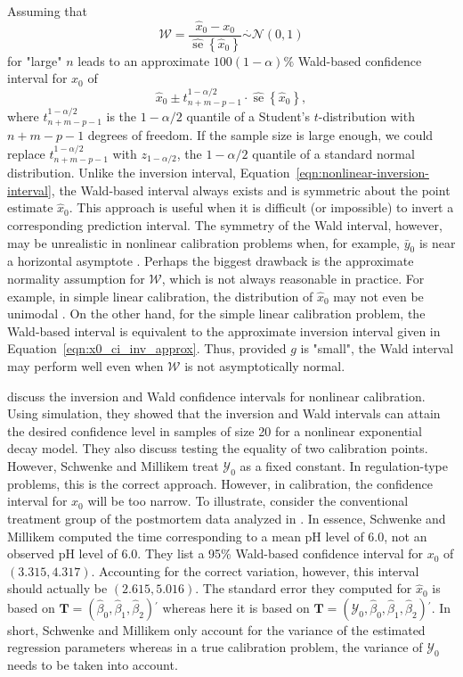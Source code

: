 \documentclass[cmfont,usenames,dvipsnames,leqno]{afit-etd}\usepackage[]{graphicx}\usepackage[]{color}
\newcommand{\trans}{\ensuremath{^\prime}}
\newcommand{\mc}[1]{\ensuremath{\mathcal{#1}}}
\newcommand{\wh}[1]{\ensuremath{\widehat{#1}}}
\newcommand{\se}{\operatorname{se}}
\begin{document}
Assuming that
\begin{equation}
\label{eqn:approx_pivot}
  \mc{W} = \frac{\wh{x}_0 - x_0}{\wh{\se}\left\{\wh{x}_0\right\}} \stackrel{\cdot}{\sim} \mc{N}(0, 1)
\end{equation}
for "large" $n$ leads to an approximate $100(1-\alpha)\%$ Wald-based confidence interval for $x_0$ of 
\begin{equation}
\label{eqn:x0_ci_wald}
  \wh{x}_0 \pm t_{n+m-p-1}^{1-\alpha/2} \cdot \wh{\se}\left\{\wh{x}_0\right\},
\end{equation}
where $t_{n+m-p-1}^{1-\alpha/2}$ is the $1-\alpha/2$ quantile of a Student's $t$-distribution with $n+m-p-1$ degrees of freedom. If the sample size is large enough, we could replace $t_{n+m-p-1}^{1-\alpha/2}$ with $z_{1-\alpha/2}$, the $1-\alpha/2$ quantile of a standard normal distribution. Unlike the inversion interval, Equation~\eqref{eqn:nonlinear-inversion-interval}, the Wald-based interval always exists and is symmetric about the point estimate $\wh{x}_0$. This approach is useful when it is difficult (or impossible) to invert a corresponding prediction interval. The symmetry of the Wald interval, however, may be unrealistic in nonlinear calibration problems when, for example, $\bar{y}_0$ is near a horizontal asymptote \citep{schwenke_callibration_1991}. Perhaps the biggest drawback is the approximate normality assumption for $\mc{W}$, which is not always reasonable in practice. For example, in simple linear calibration, the distribution of $\wh{x}_0$ may not even be unimodal \citep{buonaccorsi_design_1986}. On the other hand, for the simple linear calibration problem, the Wald-based interval is equivalent to the approximate inversion interval given in Equation~\eqref{eqn:x0_ci_inv_approx}. Thus, provided $g$ is "small", the Wald interval may perform well even when $\mc{W}$ is not asymptotically normal.

\citet{schwenke_callibration_1991} discuss the inversion and Wald confidence intervals for nonlinear calibration. Using simulation, they showed that the inversion and Wald intervals can attain the desired confidence level in samples of size 20 for a nonlinear exponential decay model. They also discuss testing the equality of two calibration points. However, Schwenke and Millikem treat $\mc{Y}_0$ as a fixed constant. In regulation-type problems, this is the correct approach. However, in calibration, the confidence interval for $x_0$ will be too narrow. To illustrate, consider the conventional treatment group of the postmortem data analyzed in \citet{schwenke_callibration_1991}. In essence, Schwenke and Millikem computed the time corresponding to a mean pH level of 6.0, not an observed pH level of 6.0. They list a 95\% Wald-based confidence interval for $x_0$ of $(3.315, 4.317)$. Accounting for the correct variation, however, this interval should actually be $(2.615, 5.016)$. The standard error they computed for $\wh{x}_0$ is based on $\bm{T} = (\wh{\beta}_0, \wh{\beta}_1, \wh{\beta}_2)\trans$ whereas here it is based on $\bm{T} = (\mc{Y}_0, \wh{\beta}_0, \wh{\beta}_1, \wh{\beta}_2)\trans$. In short, Schwenke and Millikem only account for the variance of the estimated regression parameters whereas in a true calibration problem, the variance of $\mc{Y}_0$ needs to be taken into account. 
\end{document}
